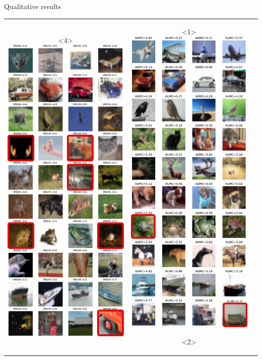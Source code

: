 \begin{frame}[t]{Qualitative results}{}
\begin{tabular}{ccc}
\begin{onlyenv}
        \end{onlyenv}%
        \begin{onlyenv}<4>
            \includegraphics[width=.3\textwidth, clip, trim={0cm 18cm 10cm 12cm}]{../chapters/images/lowest_waums_cut.pdf}
        \end{onlyenv}%
        &
        \begin{onlyenv}<1>
            \includegraphics[width=.3\textwidth, clip, trim={0cm 0cm 0cm 12cm}]{../chapters/images/AUMC_yang_cut.pdf}
        \end{onlyenv}%
        \begin{onlyenv}<2>

\end{onlyenv}
\end{tabular}
\end{frame}
